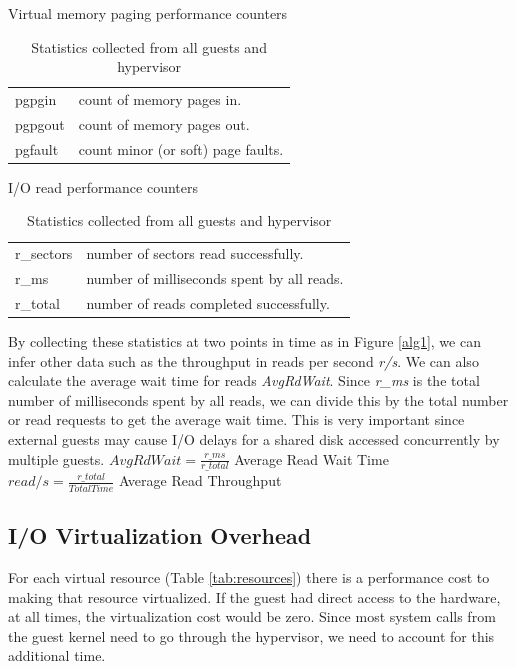 \begin{table}[h]
\begin{subtable}[h]{0.45\textwidth}
\caption{Virtual memory paging performance counters \cite{memory}}
\begin{tabular}{ l l }
       pgpgin  &  count of memory pages in. \\
       pgpgout  & count of memory pages out. \\
       pgfault  & count minor (or soft) page faults. \\
\end{tabular}
\label{fig:memory}
\end{subtable}
\hfill
\begin{subtable}[h]{0.45\textwidth}
\caption{I/O read performance counters \cite{iostats}}
\begin{tabular}{ l l }
       r\_sectors & number of sectors read successfully. \\
       r\_ms & number of milliseconds spent by all reads. \\
       r\_total & number of reads completed successfully. \\
\end{tabular}
\label{fig:io}
\end{subtable}
\caption{Statistics collected from all guests and hypervisor}
\end{table}

By collecting these statistics at two points in time as in Figure \ref{alg1}, we can infer other data such as the throughput in reads per second \emph{r/s}.  We can also calculate the average wait time for reads \emph{AvgRdWait}.  
Since \emph{r\_ms} is the total number of milliseconds spent by all reads, we can divide this by the total number or read requests to get the average wait time.  This is very important since external guests may cause I/O delays for a shared disk accessed concurrently by multiple guests.
\newline\newline
\Large
	$AvgRdWait = \frac{r\_ms}{r\_total}$   Average Read Wait Time\\
	$read/s = \frac{r\_total}{TotalTime}$  Average Read Throughput \\
\normalsize

\subsection{I/O Virtualization Overhead}
For each virtual resource (Table \ref{tab:resources}) there is a performance cost to making that resource virtualized.  If the guest had direct access to the hardware, at all times, the virtualization cost would be zero.  Since most system calls from the guest kernel need to go through the hypervisor, we need to account for this additional time.

